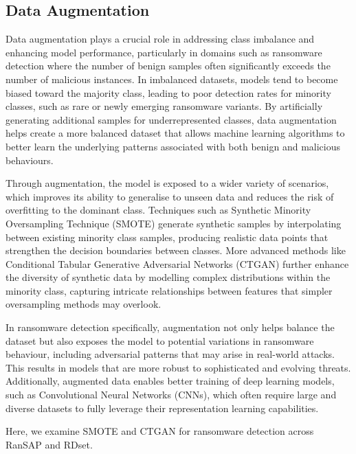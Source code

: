 \subsection{Data Augmentation}
 Data augmentation plays a crucial role in addressing class imbalance and enhancing model performance, particularly in domains such as ransomware detection where the number of benign samples often significantly exceeds the number of malicious instances. In imbalanced datasets, models tend to become biased toward the majority class, leading to poor detection rates for minority classes, such as rare or newly emerging ransomware variants. By artificially generating additional samples for underrepresented classes, data augmentation helps create a more balanced dataset that allows machine learning algorithms to better learn the underlying patterns associated with both benign and malicious behaviours.

Through augmentation, the model is exposed to a wider variety of scenarios, which improves its ability to generalise to unseen data and reduces the risk of overfitting to the dominant class. Techniques such as Synthetic Minority Oversampling Technique (SMOTE) generate synthetic samples by interpolating between existing minority class samples, producing realistic data points that strengthen the decision boundaries between classes. More advanced methods like Conditional Tabular Generative Adversarial Networks (CTGAN) further enhance the diversity of synthetic data by modelling complex distributions within the minority class, capturing intricate relationships between features that simpler oversampling methods may overlook.

In ransomware detection specifically, augmentation not only helps balance the dataset but also exposes the model to potential variations in ransomware behaviour, including adversarial patterns that may arise in real-world attacks. This results in models that are more robust to sophisticated and evolving threats. Additionally, augmented data enables better training of deep learning models, such as Convolutional Neural Networks (CNNs), which often require large and diverse datasets to fully leverage their representation learning capabilities.

Here, we examine SMOTE and CTGAN for ransomware detection across RanSAP and RDset.

